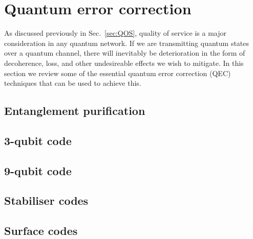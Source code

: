 %
%

\section{Quantum error correction}


As discussed previously in Sec.~\ref{sec:QOS}, quality of service is a major consideration in any quantum network. If we are transmitting quantum states over a quantum channel, there will inevitably be deterioration in the form of decoherence, loss, and other undesireable effects we wish to mitigate. In this section we review some of the essential quantum error correction (QEC) techniques that can be used to achieve this.

%
%

\subsection{Entanglement purification}


%
%

\subsection{3-qubit code}


%
%

\subsection{9-qubit code}


%
%

\subsection{Stabiliser codes}


%
%

\subsection{Surface codes}

